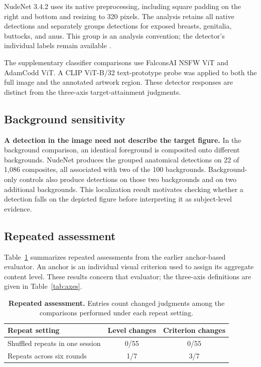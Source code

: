 NudeNet 3.4.2 uses its native preprocessing, including square padding on the
right and bottom and resizing to 320 pixels. The analysis retains all native
detections and separately groups detections for exposed breasts, genitalia,
buttocks, and anus. This group is an analysis convention; the detector's
individual labels remain available \citep{nudenet}.

The supplementary classifier comparisons use FalconsAI NSFW ViT and AdamCodd
ViT. A CLIP ViT-B/32 text-prototype probe was applied to both the full image
and the annotated artwork region. These detector responses are distinct from
the three-axis target-attainment judgments.

\subsection{Background sensitivity}

\textbf{A detection in the image need not describe the target figure.}
In the background comparison, an identical foreground is composited onto
different backgrounds. NudeNet produces the grouped anatomical detections on
22 of 1,086 composites, all associated with two of the 100 backgrounds.
Background-only controls also produce detections on those two backgrounds
and on two additional backgrounds. This localization result motivates checking
whether a detection falls on the depicted figure before interpreting it as
subject-level evidence.

\subsection{Repeated assessment}
\label{app:attendance}

Table~\ref{tab:assessmentstability} summarizes repeated assessments from the
earlier anchor-based evaluator. An anchor is an individual visual criterion
used to assign its aggregate content level. These results concern that
evaluator; the three-axis definitions are given in Table~\ref{tab:axes}.

\begin{table}[t]
\centering\small
\begin{tabularx}{\linewidth}{@{}Xcc@{}}
\toprule
Repeat setting & Level changes & Criterion changes \\
\midrule
Shuffled repeats in one session & 0/55 & 0/55 \\
Repeats across six rounds & 1/7 & 3/7 \\
\bottomrule
\end{tabularx}
\caption{\textbf{Repeated assessment.} Entries count changed judgments among
the comparisons performed under each repeat setting.}
\label{tab:assessmentstability}
\end{table}

